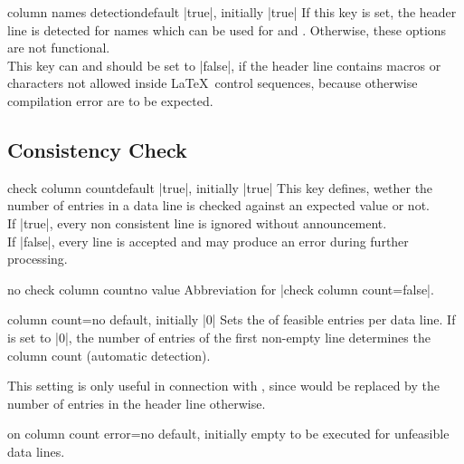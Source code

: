 \documentclass[a4paper,11pt]{ltxdoc}
\begin{document}
\begin{docCsvKey}[][doc new=2022-02-01]{column names detection}{}{default |true|, initially |true|}
  If this key is set, the header line is detected for names which can be used
  for  and .
  Otherwise, these options are not functional.\\
  This key can and should be set to |false|, if the header line contains
  macros or characters not allowed inside \LaTeX\ control sequences, because
  otherwise compilation error are to be expected.
\end{docCsvKey}


\clearpage
\subsection{Consistency Check}\label{sec:consistency}%

\begin{docCsvKey}{check column count}{}{default |true|, initially |true|}
  This key defines, wether the number of entries in a data line is checked against
  an expected value or not.\\
  If |true|, every non consistent line is ignored without announcement.\\
  If |false|, every line is accepted and may produce an error during
  further processing.
\end{docCsvKey}


\begin{docCsvKey}{no check column count}{}{no value}
  Abbreviation for |check column count=false|.
\end{docCsvKey}


\begin{docCsvKey}[][doc updated=2021-06-24]{column count}{=}{no default, initially |0|}
  Sets the  of feasible entries per data line.
  If  is set to |0|, the number of entries of
  the first non-empty line determines the column count (automatic detection).

  This setting is only useful in connection with ,
  since  would be replaced by the number of entries in the
  header line otherwise.
\end{docCsvKey}


\begin{docCsvKey}{on column count error}{=}{no default, initially empty}
   to be executed for unfeasible data lines.
\end{docCsvKey}
\end{document}

